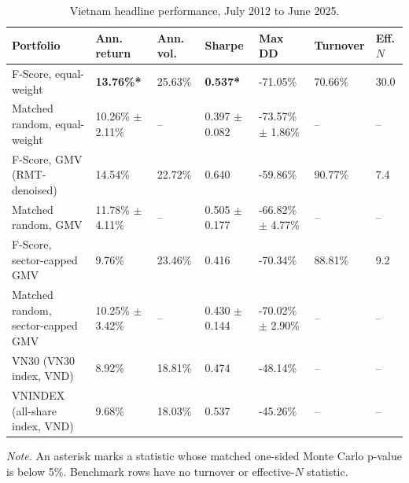 \documentclass[11pt,a4paper]{report}
\numberwithin{figure}{chapter}
\numberwithin{table}{chapter}
\numberwithin{equation}{chapter}
\begin{document}
\begin{table}[H]
\centering
\scriptsize
\caption{Vietnam headline performance, July 2012 to June 2025.}
\label{tab:vietnam_headline}

\setlength{\tabcolsep}{2.5pt}

\begin{tabular}{
@{}
M{0.26\textwidth}
M{0.13\textwidth}
M{0.09\textwidth}
M{0.12\textwidth}
M{0.13\textwidth}
M{0.09\textwidth}
M{0.06\textwidth}
@{}
}
\hline
\textbf{Portfolio} &
\textbf{Ann. return} &
\textbf{Ann. vol.} &
\textbf{Sharpe} &
\textbf{Max DD} &
\textbf{Turnover} &
\textbf{Eff. $N$} \\
\hline

F-Score, equal-weight
& \textbf{13.76\%*}
& 25.63\%
& \textbf{0.537*}
& -71.05\%
& 70.66\%
& 30.0 \\
\hline{}

Matched random, equal-weight
& 10.26\% $\pm$ 2.11\%
& --
& 0.397 $\pm$ 0.082
& -73.57\% $\pm$ 1.86\%
& --
& -- \\
\hline{}

F-Score, GMV (RMT-denoised)
& 14.54\%
& 22.72\%
& 0.640
& -59.86\%
& 90.77\%
& 7.4 \\
\hline{}

Matched random, GMV
& 11.78\% $\pm$ 4.11\%
& --
& 0.505 $\pm$ 0.177
& -66.82\% $\pm$ 4.77\%
& --
& -- \\
\hline{}

F-Score, sector-capped GMV
& 9.76\%
& 23.46\%
& 0.416
& -70.34\%
& 88.81\%
& 9.2 \\
\hline{}

Matched random, sector-capped GMV
& 10.25\% $\pm$ 3.42\%
& --
& 0.430 $\pm$ 0.144
& -70.02\% $\pm$ 2.90\%
& --
& -- \\
\hline{}

VN30 (VN30 index, VND)
& 8.92\%
& 18.81\%
& 0.474
& -48.14\%
& --
& -- \\
\hline{}

VNINDEX (all-share index, VND)
& 9.68\%
& 18.03\%
& 0.537
& -45.26\%
& --
& -- \\

\hline
\end{tabular}

\vspace{1in}

\begin{minipage}{0.98\textwidth}
\scriptsize
\textit{Note.} An asterisk marks a statistic whose matched one-sided Monte Carlo p-value is below 5\%. Benchmark rows have no turnover or effective-$N$ statistic.
\end{minipage}
\end{table}
\end{document}
